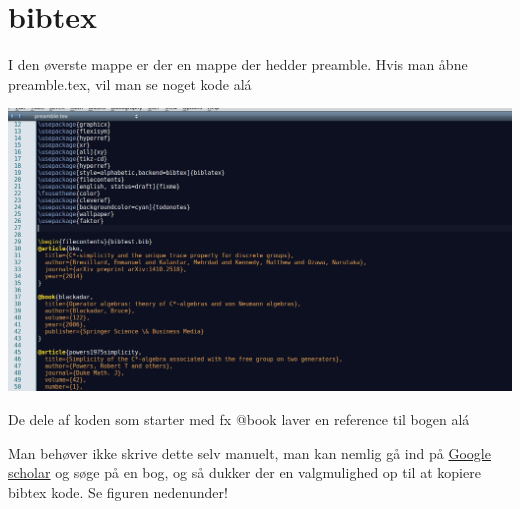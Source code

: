 \section{bibtex}
I den øverste mappe er der en mappe der hedder preamble. Hvis man åbne preamble.tex, vil man se noget kode alá
\begin{center}
\includegraphics[scale=0.2]{figure/1.png}\\
\end{center}
De dele af koden som starter med fx @book laver en reference til bogen alá \begin{center}
\cite[Proposition 5][7]{zhu}
\end{center} Man behøver ikke skrive dette selv manuelt, man kan nemlig gå ind på \href{https://scholar.google.dk/}{Google scholar} og søge på en bog, og så dukker der en valgmulighed op til at kopiere bibtex kode. Se figuren nedenunder!


